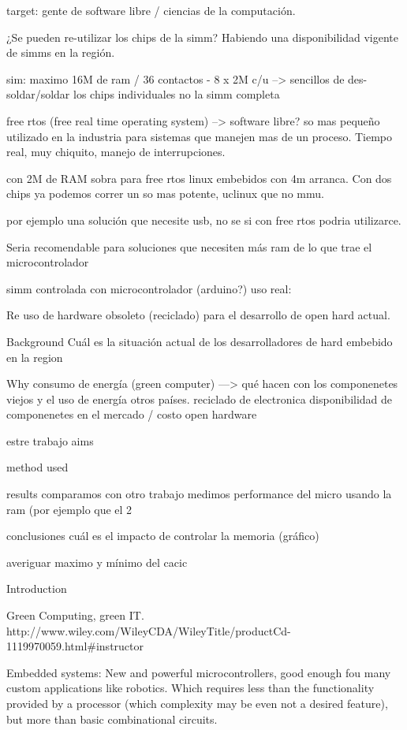 target: gente de software libre / ciencias de la computación. 

¿Se pueden re-utilizar los chips de la simm? Habiendo una disponibilidad vigente 
de simms en la región.

sim: maximo 16M de ram / 36 contactos  - 8 x 2M c/u 
\---> sencillos de des-soldar/soldar los chips individuales no la simm completa

free rtos (free real time operating system) --> software libre? 
so mas pequeño utilizado en la industria para sistemas que manejen 
mas de un proceso. Tiempo real, muy chiquito, manejo de interrupciones. 

con 2M de RAM sobra para free rtos
linux embebidos con 4m arranca. Con dos chips ya podemos correr un so 
mas potente, uclinux que no mmu. 

por ejemplo una solución que necesite usb, no se si con free rtos podria 
utilizarce. 

Seria recomendable para soluciones que necesiten más ram de lo que trae
el microcontrolador

simm controlada con microcontrolador  (arduino?)
uso real:

Re uso de hardware obsoleto (reciclado) para el desarrollo de open hard actual. 

Background 
Cuál es la situación actual de los desarrolladores de hard embebido en la region

Why
	consumo de energía (green computer)
		\----> 	qué hacen con los componenetes viejos y el uso de 
			energía otros países.
	reciclado de electronica 
	disponibilidad de componenetes en el mercado / costo 
	open hardware 

estre trabajo aims


method used 

results 
	comparamos con otro trabajo 
	medimos performance del micro usando la ram 
	(por ejemplo que el 2%

conclusiones
	cuál es el impacto de controlar la memoria (gráfico)

averiguar maximo y mínimo del cacic



Introduction


Green Computing, green IT. 
http://www.wiley.com/WileyCDA/WileyTitle/productCd-1119970059.html#instructor

Embedded systems: 
New and powerful microcontrollers, good enough fou many custom applications 
like robotics. Which requires less than the functionality provided by a processor (which complexity may be even not a desired feature), but more than basic combinational circuits. 

